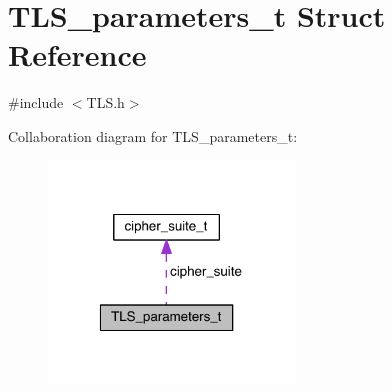 \hypertarget{struct_t_l_s__parameters__t}{}\section{T\+L\+S\+\_\+parameters\+\_\+t Struct Reference}
\label{struct_t_l_s__parameters__t}


{\ttfamily \#include $<$T\+L\+S.\+h$>$}



Collaboration diagram for T\+L\+S\+\_\+parameters\+\_\+t\+:\nopagebreak
\begin{figure}[H]
\begin{center}
\leavevmode
\includegraphics[width=186pt]{struct_t_l_s__parameters__t__coll__graph}
\end{center}
\end{figure}
